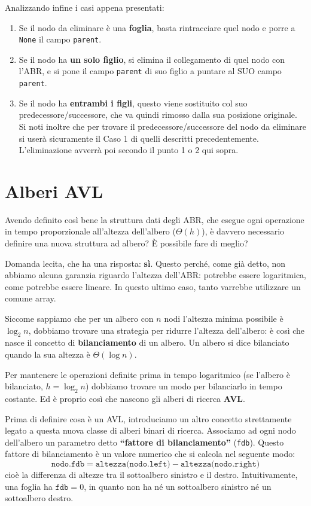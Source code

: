 \documentclass[12pt]{report}
\begin{document}
	Analizzando infine i casi appena presentati:
	\begin{enumerate}
		\item Se il nodo da eliminare è una \textbf{foglia}, basta rintracciare quel nodo e porre a \texttt{None} il campo \texttt{parent}.
		\item Se il nodo ha \textbf{un solo figlio}, si elimina il collegamento di quel nodo con l'ABR, e si pone il campo \texttt{parent} di suo figlio a puntare al SUO campo \texttt{parent}.
		\item Se il nodo ha \textbf{entrambi i figli}, questo viene sostituito col suo predecessore/successore, che va quindi rimosso dalla sua posizione originale. Si noti inoltre che per trovare il predecessore/successore del nodo da eliminare si userà sicuramente il Caso 1 di quelli descritti precedentemente. L'eliminazione avverrà poi secondo il punto 1 o 2 qui sopra.
	\end{enumerate}
	
	\section{Alberi AVL}
	Avendo definito così bene la struttura dati degli ABR, che esegue ogni operazione in tempo proporzionale all'altezza dell'albero ($\Theta(h)$), è davvero necessario definire una nuova struttura ad albero? È possibile fare di meglio?
	
	Domanda lecita, che ha una risposta: \textbf{sì}. Questo perché, come già detto, non abbiamo alcuna garanzia riguardo l'altezza dell'ABR: potrebbe essere logaritmica, come potrebbe essere lineare. In questo ultimo caso, tanto varrebbe utilizzare un comune array.
	
	Siccome sappiamo che per un albero con $n$ nodi l'altezza minima possibile è $\log_2 n$, dobbiamo trovare una strategia per ridurre l'altezza dell'albero: è così che nasce il concetto di \textbf{bilanciamento} di un albero. Un albero si dice bilanciato quando la sua altezza è $\Theta(\log n)$.
	
	Per mantenere le operazioni definite prima in tempo logaritmico (se l'albero è bilanciato, $h = \log_2 n$) dobbiamo trovare un modo per bilanciarlo in tempo costante. Ed è proprio così che nascono gli alberi di ricerca \textbf{AVL}.
	
	Prima di definire cosa è un AVL, introduciamo un altro concetto strettamente legato a questa nuova classe di alberi binari di ricerca. Associamo ad ogni nodo dell'albero un parametro detto \textbf{``fattore di bilanciamento''} (\texttt{fdb}). Questo fattore di bilanciamento è un valore numerico che si calcola nel seguente modo:
	\[
	\texttt{nodo.fdb} = \texttt{altezza(nodo.left)} - \texttt{altezza(nodo.right)}
	\]
	cioè la differenza di altezze tra il sottoalbero sinistro e il destro. Intuitivamente, una foglia ha $\texttt{fdb} = 0$, in quanto non ha né un sottoalbero sinistro né un sottoalbero destro.
	
\end{document}
